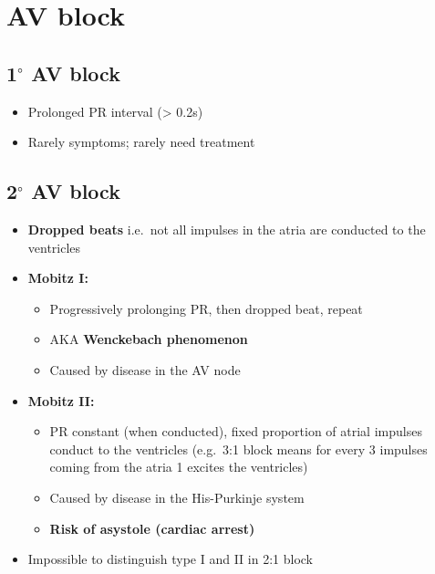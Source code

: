 \documentclass[
  12pt,
]{memoir}
\providecommand{\tightlist}{%
  \setlength{\itemsep}{0pt}\setlength{\parskip}{0pt}}
\begin{document}
\hypertarget{av-block}{%
\section{AV block}\label{av-block}}

\hypertarget{circ-av-block}{%
\subsection{\texorpdfstring{1\(^\circ\) AV
block}{1\^{}\textbackslash circ AV block}}\label{circ-av-block}}

\begin{itemize}
\tightlist
\item
  Prolonged PR interval (\textgreater{} 0.2s)
\item
  Rarely symptoms; rarely need treatment
\end{itemize}

\hypertarget{circ-av-block-1}{%
\subsection{\texorpdfstring{2\(^\circ\) AV
block}{2\^{}\textbackslash circ AV block}}\label{circ-av-block-1}}

\begin{itemize}
\tightlist
\item
  \textbf{Dropped beats} i.e.~not all impulses in the atria are
  conducted to the ventricles
\item
  \textbf{Mobitz I:}

  \begin{itemize}
  \tightlist
  \item
    Progressively prolonging PR, then dropped beat, repeat
  \item
    AKA \textbf{Wenckebach phenomenon}
  \item
    Caused by disease in the AV node
  \end{itemize}
\item
  \textbf{Mobitz II:}

  \begin{itemize}
  \tightlist
  \item
    PR constant (when conducted), fixed proportion of atrial impulses
    conduct to the ventricles (e.g.~3:1 block means for every 3 impulses
    coming from the atria 1 excites the ventricles)
  \item
    Caused by disease in the His-Purkinje system
  \item
    \textbf{Risk of asystole (cardiac arrest)}
  \end{itemize}
\item
  Impossible to distinguish type I and II in 2:1 block
\end{itemize}
\end{document}
